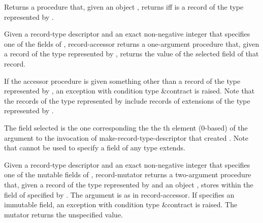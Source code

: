 \begin{entry}{%
}
   
Returns a procedure that, given an object , returns
\schtrue{} iff  is a record of the type represented by
.
\end{entry}

\begin{entry}{%
}
   
Given a record-type descriptor  and an exact non-negative
integer  that specifies one of the fields of , {\cf
  record-accessor} returns a one-argument procedure that, given a
record of the type represented by , returns the value of the
selected field of that record.

If the accessor procedure is given something other than
a record of the type represented by , an exception with
condition type {\cf\&contract} is raised.  Note that the records
of the type represented by  include records of extensions of
the type represented by .

The field selected is the one corresponding the the th element
(0-based) of the  argument to the invocation of {\cf
  make-record-type-descriptor} that created . Note that
 cannot be used to specify a field of any type  extends.
\end{entry}

\begin{entry}{%
}
   
Given a record-type descriptor  and an exact non-negative
integer  that specifies one of the mutable fields of ,
{\cf record-mutator} returns a two-argument procedure that, given a
record  of the type represented by  and an object
, stores  within the field of  specified by
. The  argument is as in {\cf record-accessor}. If
 specifies an immutable field, an exception with condition type
{\cf\&contract} is raised.
The mutator returns the unspecified value.
\end{entry}

